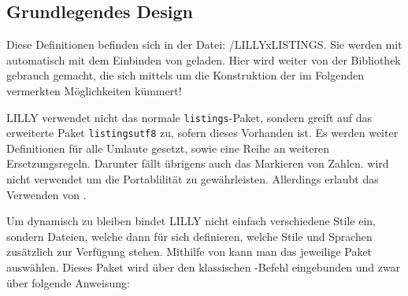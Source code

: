 \subsection{Grundlegendes Design}

Diese Definitionen befinden sich in der Datei: {\ltt{}/LILLYxLISTINGS}. Sie werden mit  automatisch mit dem Einbinden von  geladen.\medskip\newline
Hier wird weiter von der Bibliothek  gebrauch gemacht, die sich mittels  um die Konstruktion der im Folgenden vermerkten Möglichkeiten kümmert!
\begin{bemerkung}
    LILLY verwendet nicht das normale \verb|listings|-Paket, sondern greift auf das erweiterte Paket \verb|listingsutf8| zu, sofern dieses Vorhanden ist. Es werden weiter Definitionen für alle Umlaute gesetzt, sowie eine Reihe an weiteren Ersetzungsregeln. Darunter fällt übrigens auch das Markieren von Zahlen.  wird nicht verwendet um die Portablilität zu gewährleisten. Allerdings erlaubt  das Verwenden von .
\end{bemerkung}
Um dynamisch zu bleiben bindet LILLY nicht einfach verschiedene Stile ein, sondern Dateien, welche dann für sich definieren, welche Stile und Sprachen zusätzlich zur Verfügung stehen. %
Mithilfe von  kann man das jeweilige Paket auswählen. Dieses Paket wird über den klassischen -Befehl eingebunden und zwar über folgende Anweisung:
{\small\begin{latex*}

\end{latex*}}

